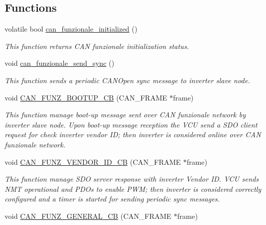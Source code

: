 \subsection*{Functions}
\begin{DoxyCompactItemize}
\item 
volatile bool \hyperlink{group___c_a_n__funzionale__group_gaf1acdfa5537f47656edd6ffa3e7c24bd}{can\-\_\-funzionale\-\_\-initialized} ()
\begin{DoxyCompactList}\small\item\em This function returns C\-A\-N funzionale initialization status. \end{DoxyCompactList}\item 
void \hyperlink{group___c_a_n__funzionale__group_gac93bbbf1b84f1bc82b26d54d7f898172}{can\-\_\-funzionale\-\_\-send\-\_\-sync} ()
\begin{DoxyCompactList}\small\item\em This function sends a periodic C\-A\-N\-Open sync message to inverter slave node. \end{DoxyCompactList}\item 
void \hyperlink{group___c_a_n__funzionale__group_gaf4990e00c0c4a9f9eeb9cb5bdaecfa94}{C\-A\-N\-\_\-\-F\-U\-N\-Z\-\_\-\-B\-O\-O\-T\-U\-P\-\_\-\-C\-B} (C\-A\-N\-\_\-\-F\-R\-A\-M\-E $\ast$frame)
\begin{DoxyCompactList}\small\item\em This function manage boot-\/up message sent over C\-A\-N funzionale network by inverter slave node. Upon boot-\/up message reception the V\-C\-U send a S\-D\-O client request for check inverter vendor I\-D; then inverter is considered online over C\-A\-N funzionale network. \end{DoxyCompactList}\item 
void \hyperlink{group___c_a_n__funzionale__group_ga81bbc4c65d579febfbcae399f0ecbffc}{C\-A\-N\-\_\-\-F\-U\-N\-Z\-\_\-\-V\-E\-N\-D\-O\-R\-\_\-\-I\-D\-\_\-\-C\-B} (C\-A\-N\-\_\-\-F\-R\-A\-M\-E $\ast$frame)
\begin{DoxyCompactList}\small\item\em This function manage S\-D\-O server response with inverter Vendor I\-D. V\-C\-U sends N\-M\-T operational and P\-D\-Os to enable P\-W\-M; then inverter is considered correctly configured and a timer is started for sending periodic sync messages. \end{DoxyCompactList}\item 
void \hyperlink{group___c_a_n__funzionale__group_ga1fcfa8e31cfbfe2461328c345b5b8e19}{C\-A\-N\-\_\-\-F\-U\-N\-Z\-\_\-\-G\-E\-N\-E\-R\-A\-L\-\_\-\-C\-B} (C\-A\-N\-\_\-\-F\-R\-A\-M\-E $\ast$frame)

\end{DoxyCompactItemize}
